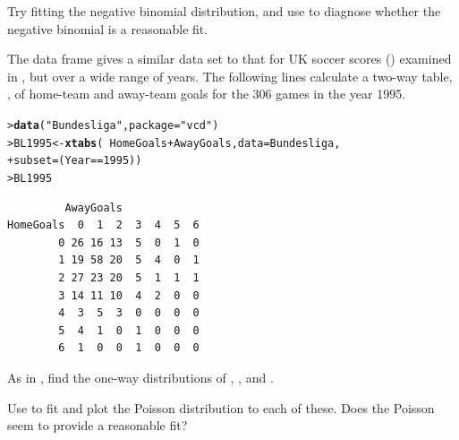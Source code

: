 \documentclass[11pt]{report}\usepackage[]{graphicx}\usepackage[]{color}
\makeatletter
\newcommand{\hlnum}[1]{\textcolor[rgb]{0.686,0.059,0.569}{#1}}%
\newcommand{\hlstr}[1]{\textcolor[rgb]{0.192,0.494,0.8}{#1}}%
\newcommand{\hlopt}[1]{\textcolor[rgb]{0,0,0}{#1}}%
\newcommand{\hlstd}[1]{\textcolor[rgb]{0.345,0.345,0.345}{#1}}%
\newcommand{\hlkwb}[1]{\textcolor[rgb]{0.69,0.353,0.396}{#1}}%
\newcommand{\hlkwc}[1]{\textcolor[rgb]{0.333,0.667,0.333}{#1}}%
\newcommand{\hlkwd}[1]{\textcolor[rgb]{0.737,0.353,0.396}{\textbf{#1}}}%
\newenvironment{kframe}{%
 \def\at@end@of@kframe{}%
 \ifinner\ifhmode%
  \def\at@end@of@kframe{\end{minipage}}%
  \begin{minipage}{\columnwidth}%
 \fi\fi%
 \def\FrameCommand##1{\hskip\@totalleftmargin \hskip-\fboxsep
 \colorbox{shadecolor}{##1}\hskip-\fboxsep
     \hskip-\linewidth \hskip-\@totalleftmargin \hskip\columnwidth}%
 \MakeFramed {\advance\hsize-\width
   \@totalleftmargin\z@ \linewidth\hsize
   \@setminipage}}%
 {\par\unskip\endMakeFramed%
 \at@end@of@kframe}
\newenvironment{knitrout}{}{} %
\renewenvironment{knitrout}{\small\renewcommand{\baselinestretch}{.85}}{} %
\makeatother
\begin{document}
\begin{Exercises}
\begin{enumerate*}
    \item Try fitting the negative binomial distribution, and use  to diagnose
    whether the negative binomial is a reasonable fit.
    \begin{ans}
    \end{ans}
    
  \end{enumerate*}

  \exercise The data frame  gives a similar data set to that for UK soccer scores
  ()
  examined in , but over a wide range of years.  The following lines calculate
  a two-way table, , of home-team and away-team goals
  for the 306 games in the year 1995.
\begin{knitrout}
\color{fgcolor}\begin{kframe}
\begin{alltt}
\hlstd{> }\hlkwd{data}\hlstd{(}\hlstr{"Bundesliga"}\hlstd{,} \hlkwc{package} \hlstd{=} \hlstr{"vcd"}\hlstd{)}
\hlstd{> }\hlstd{BL1995} \hlkwb{<-} \hlkwd{xtabs}\hlstd{(}\hlopt{~} \hlstd{HomeGoals} \hlopt{+} \hlstd{AwayGoals,} \hlkwc{data} \hlstd{= Bundesliga,}
\hlstd{+ }                \hlkwc{subset} \hlstd{= (Year} \hlopt{==} \hlnum{1995}\hlstd{))}
\hlstd{> }\hlstd{BL1995}
\end{alltt}
\begin{verbatim}
         AwayGoals
HomeGoals  0  1  2  3  4  5  6
        0 26 16 13  5  0  1  0
        1 19 58 20  5  4  0  1
        2 27 23 20  5  1  1  1
        3 14 11 10  4  2  0  0
        4  3  5  3  0  0  0  0
        5  4  1  0  1  0  0  0
        6  1  0  0  1  0  0  0
\end{verbatim}
\end{kframe}
\end{knitrout}
  \begin{enumerate*}
    \item As in , find the one-way distributions of ,
    , and .

    \begin{ans}
    \end{ans}
    
    \item Use  to fit and plot the Poisson distribution to each of these.  Does the
    Poisson seem to provide a reasonable fit?
    \begin{ans}
    \end{ans}
    

\end{enumerate*}
\end{Exercises}
\end{document}

